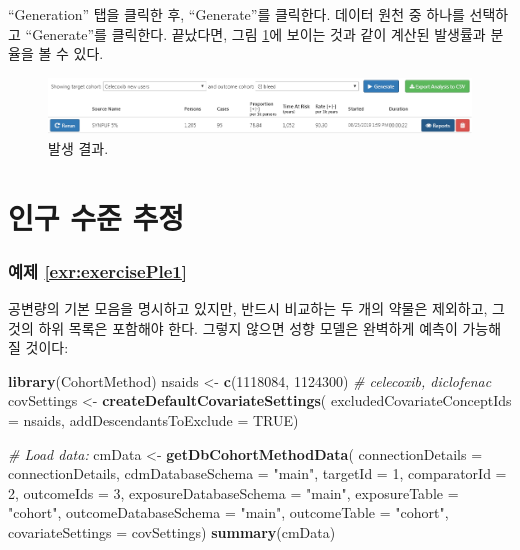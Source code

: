 \documentclass[10.5pt]{book}
\newenvironment{Shaded}{\begin{snugshade}}{\end{snugshade}}
\newcommand{\KeywordTok}[1]{\textcolor[rgb]{0.13,0.29,0.53}{\textbf{#1}}}
\newcommand{\DataTypeTok}[1]{\textcolor[rgb]{0.13,0.29,0.53}{#1}}
\newcommand{\DecValTok}[1]{\textcolor[rgb]{0.00,0.00,0.81}{#1}}
\newcommand{\StringTok}[1]{\textcolor[rgb]{0.31,0.60,0.02}{#1}}
\newcommand{\CommentTok}[1]{\textcolor[rgb]{0.56,0.35,0.01}{\textit{#1}}}
\newcommand{\OtherTok}[1]{\textcolor[rgb]{0.56,0.35,0.01}{#1}}
\newcommand{\NormalTok}[1]{#1}
\theoremstyle{definition}
\theoremstyle{definition}
\theoremstyle{definition}
\theoremstyle{remark}
\begin{document}
``Generation'' 탭을 클릭한 후, ``Generate''를 클릭한다. 데이터 원천 중
하나를 선택하고 ``Generate''를 클릭한다. 끝났다면, 그림
\ref{fig:irResults}에 보이는 것과 같이 계산된 발생률과 분율을 볼 수
있다.

\begin{figure}

{\centering \includegraphics[width=1\linewidth]{images/SuggestedAnswers/irResults} 

}

\caption{발생 결과.}\label{fig:irResults}
\end{figure}

\section{인구 수준 추정}\label{Pleanswers}

\subsubsection*{예제 \ref{exr:exercisePle1}}\label{-refexrexerciseple1}

공변량의 기본 모음을 명시하고 있지만, 반드시 비교하는 두 개의 약물은
제외하고, 그것의 하위 목록은 포함해야 한다. 그렇지 않으면 성향 모델은
완벽하게 예측이 가능해질 것이다:

\begin{Shaded}
\begin{Highlighting}[]
\KeywordTok{library}\NormalTok{(CohortMethod)}
\NormalTok{nsaids <-}\StringTok{ }\KeywordTok{c}\NormalTok{(}\DecValTok{1118084}\NormalTok{, }\DecValTok{1124300}\NormalTok{) }\CommentTok{# celecoxib, diclofenac}
\NormalTok{covSettings <-}\StringTok{ }\KeywordTok{createDefaultCovariateSettings}\NormalTok{(}
  \DataTypeTok{excludedCovariateConceptIds =}\NormalTok{ nsaids,}
  \DataTypeTok{addDescendantsToExclude =} \OtherTok{TRUE}\NormalTok{)}

\CommentTok{# Load data:}
\NormalTok{cmData <-}\StringTok{ }\KeywordTok{getDbCohortMethodData}\NormalTok{(}
  \DataTypeTok{connectionDetails =}\NormalTok{ connectionDetails,}
  \DataTypeTok{cdmDatabaseSchema =} \StringTok{"main"}\NormalTok{,}
  \DataTypeTok{targetId =} \DecValTok{1}\NormalTok{,}
  \DataTypeTok{comparatorId =} \DecValTok{2}\NormalTok{,}
  \DataTypeTok{outcomeIds =} \DecValTok{3}\NormalTok{,}
  \DataTypeTok{exposureDatabaseSchema =} \StringTok{"main"}\NormalTok{,}
  \DataTypeTok{exposureTable =} \StringTok{"cohort"}\NormalTok{,}
  \DataTypeTok{outcomeDatabaseSchema =} \StringTok{"main"}\NormalTok{,}
  \DataTypeTok{outcomeTable =} \StringTok{"cohort"}\NormalTok{,}
  \DataTypeTok{covariateSettings =}\NormalTok{ covSettings)}
\KeywordTok{summary}\NormalTok{(cmData)}
\end{Highlighting}
\end{Shaded}
\end{document}
